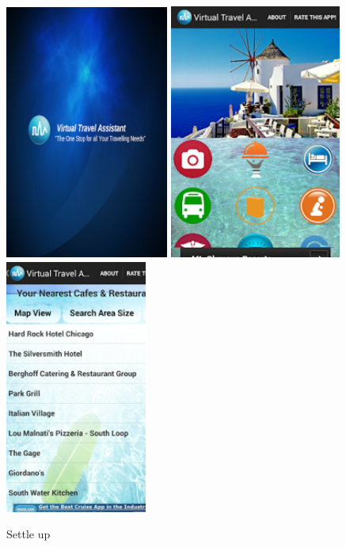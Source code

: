 \begin{itemize}
\begin{figure}[!h]
\centering
\includegraphics[scale=0.85]{Figures/vta1.png}
\includegraphics[scale=0.85]{Figures/vta2.png}
\includegraphics[scale=0.85]{Figures/vta3.png}
\caption{Settle up}
\end{figure}

\end{itemize}

